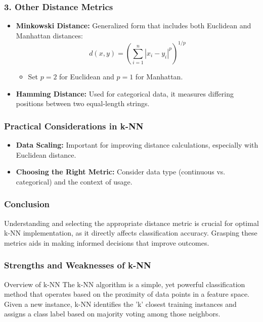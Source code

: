 \documentclass[aspectratio=169]{beamer}
\begin{document}
\begin{frame}[fragile]
    \frametitle{3. Other Distance Metrics}
    \begin{itemize}
        \item \textbf{Minkowski Distance:} Generalized form that includes both Euclidean and Manhattan distances:
        \begin{equation}
            d(x, y) = \left( \sum_{i=1}^{n} |x_i - y_i|^p \right)^{1/p}
        \end{equation}
        \begin{itemize}
            \item Set \( p = 2 \) for Euclidean and \( p = 1 \) for Manhattan.
        \end{itemize}
        
        \item \textbf{Hamming Distance:} Used for categorical data, it measures differing positions between two equal-length strings.
    \end{itemize}
\end{frame}

\begin{frame}[fragile]
    \frametitle{Practical Considerations in k-NN}
    \begin{itemize}
        \item \textbf{Data Scaling:} Important for improving distance calculations, especially with Euclidean distance.
        \item \textbf{Choosing the Right Metric:} Consider data type (continuous vs. categorical) and the context of usage.
    \end{itemize}
\end{frame}

\begin{frame}[fragile]
    \frametitle{Conclusion}
    Understanding and selecting the appropriate distance metric is crucial for optimal k-NN implementation, as it directly affects classification accuracy. Grasping these metrics aids in making informed decisions that improve outcomes.
\end{frame}

\begin{frame}[fragile]
    \frametitle{Strengths and Weaknesses of k-NN}
    \begin{block}{Overview of k-NN}
        The k-NN algorithm is a simple, yet powerful classification method that operates based on the proximity of data points in a feature space. Given a new instance, k-NN identifies the 'k' closest training instances and assigns a class label based on majority voting among those neighbors.
    \end{block}
\end{frame}
\end{document}
